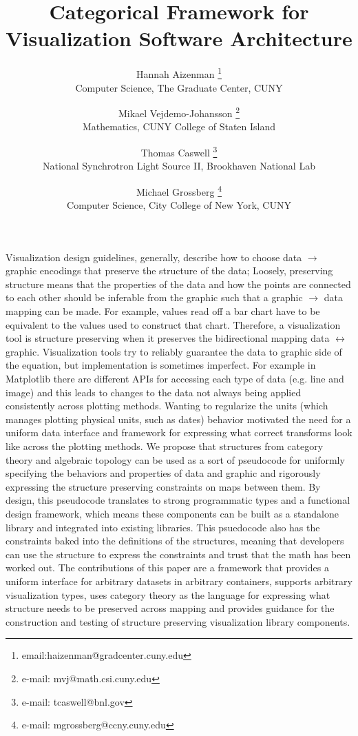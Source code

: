 \documentclass{vgtc}
\title{Categorical Framework for Visualization Software Architecture}
\author{Hannah Aizenman \thanks{email:haizenman@gradcenter.cuny.edu}\\%
        \scriptsize Computer Science, The Graduate Center, CUNY
\and Mikael Vejdemo-Johansson \thanks{e-mail: mvj@math.csi.cuny.edu}\\%
        \scriptsize  Mathematics, CUNY College of Staten Island %
\and Thomas Caswell \thanks{e-mail: tcaswell@bnl.gov}\\%
  \scriptsize National Synchrotron Light Source II, Brookhaven National Lab%
\and Michael Grossberg \thanks{e-mail: mgrossberg@ccny.cuny.edu}\\%
  \scriptsize Computer Science, City College of New York, CUNY}
\theoremstyle{definition}
\theoremstyle{remark}
\begin{document}

\label{sec:intro}

\maketitle

Visualization design guidelines, generally, describe how to choose data $\rightarrow$ graphic encodings that preserve the structure of the data;  Loosely, preserving structure means that the properties of the data and how the points are connected to each other should be inferable from the graphic such that a graphic $\rightarrow$ data mapping can be made. For example, values read off a bar chart have to be equivalent to the values used to construct that chart. Therefore, a visualization tool is structure preserving when it preserves the bidirectional mapping data $\leftrightarrow$ graphic. Visualization tools try to reliably guarantee the data to graphic side of the equation, but implementation is sometimes imperfect. For example in  Matplotlib there are different APIs for accessing each type of data (e.g. line and image) and this leads to changes to the data not always being applied consistently across plotting methods. Wanting to regularize the units (which manages plotting physical units, such as dates) behavior motivated the need for a uniform data interface and framework for expressing what correct transforms look like across the plotting methods. We propose that structures from category theory and algebraic topology can be used as a sort of pseudocode for uniformly specifying the behaviors and properties of data and graphic and rigorously expressing the structure preserving constraints on maps between them. By design, this pseudocode translates to strong programmatic types and a functional design framework, which means these components can be built as a standalone library and integrated into existing libraries.  This psuedocode also has the constraints baked into the definitions of the structures, meaning that developers can use the structure to express the constraints and trust that the math has been worked out. The contributions of this paper are a framework that provides a uniform interface for arbitrary datasets in arbitrary containers, supports arbitrary visualization types, uses category theory as the language for expressing what structure needs to be preserved across mapping and provides guidance for the construction and testing of structure preserving visualization library components.
\end{document}
